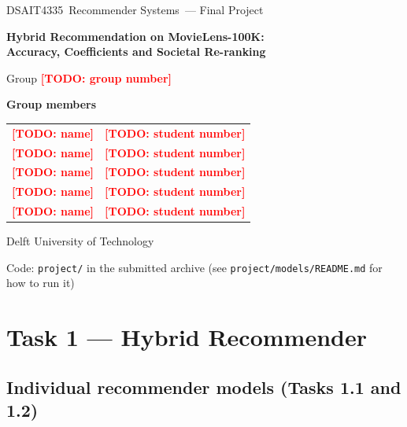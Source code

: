 \documentclass[12pt,a4paper]{article}
\newcommand{\coursecode}{DSAIT4335}
\newcommand{\coursename}{Recommender Systems}
\newcommand{\projecttitle}{Hybrid Recommendation on MovieLens-100K:\\ Accuracy, Coefficients and Societal Re-ranking}
\newcommand{\groupnumber}{\TODO{group number}}
\newcommand{\TODO}[1]{\textcolor{red}{\textbf{[TODO: #1]}}}
\newcommand{\owner}[1]{\marginpar{\footnotesize\color{gray}#1}}   %
\begin{document}
\begin{titlepage}
  \centering
  \vspace*{3cm}
  {\large \coursecode\ \coursename\ --- Final Project\par}
  \vspace{1.5cm}
  {\LARGE\bfseries \projecttitle\par}
  \vspace{1.5cm}
  {\Large Group \groupnumber\par}
  \vspace{1.5cm}
  {\large\bfseries Group members\par}
  \vspace{0.5em}
  \begin{tabular}{ll}
    \TODO{name} & \TODO{student number}\\
    \TODO{name} & \TODO{student number}\\
    \TODO{name} & \TODO{student number}\\
    \TODO{name} & \TODO{student number}\\
    \TODO{name} & \TODO{student number}\\
  \end{tabular}
  \vfill
  {\large Delft University of Technology\par}
  {\normalsize Code: \texttt{project/} in the submitted archive (see \texttt{project/models/README.md} for how to run it)\par}
\end{titlepage}

\section{Task 1 --- Hybrid Recommender}
\label{sec:task1}

\subsection{Individual recommender models (Tasks 1.1 and 1.2)}\owner{A}
\label{sec:task1-individual}
\end{document}

